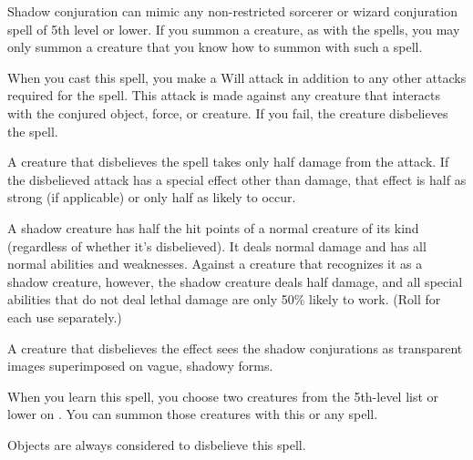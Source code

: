 \begin{spelleffect}
    Shadow conjuration can mimic any non-restricted sorcerer or wizard conjuration spell of 5th level or lower. If you summon a creature, as with the  spells, you may only summon a creature that you know how to summon with such a spell.
    \par When you cast this spell, you make a Will attack in addition to any other attacks required for the spell. This attack is made against any creature that interacts with the conjured object, force, or creature. If you fail, the creature disbelieves the spell.
    \par A creature that disbelieves the spell takes only half damage from the attack. If the disbelieved attack has a special effect other than damage, that effect is half as strong (if applicable) or only half as likely to occur.
    \par A shadow creature has half the hit points of a normal creature of its kind (regardless of whether it's disbelieved). It deals normal damage and has all normal abilities and weaknesses. Against a creature that recognizes it as a shadow creature, however, the shadow creature deals half damage, and all special abilities that do not deal lethal damage are only 50\% likely to work. (Roll for each use separately.)
\end{spelleffect}
\begin{spellnotes}
    A creature that disbelieves the effect sees the shadow conjurations as transparent images superimposed on vague, shadowy forms.
    \par When you learn this spell, you choose two creatures from the 5th-level list or lower on . You can summon those creatures with this or any  spell.
    \par Objects are always considered to disbelieve this spell.
\end{spellnotes}

